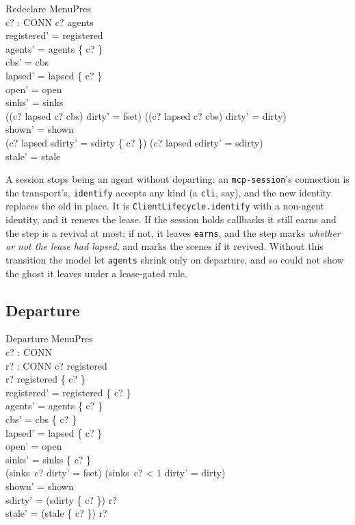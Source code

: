 \documentclass[a4paper,10pt,fleqn]{article}
\begin{document}
\begin{schema}{Redeclare}
  \Delta MenuPres \\
  c? : CONN
\where
  c? \in agents \\
  registered' = registered \\
  agents' = agents \setminus \{ c? \} \\
  cbs' = cbs \\
  lapsed' = lapsed \setminus \{ c? \} \\
  open' = open \\
  sinks' = sinks \\
  ((c? \in lapsed \lor c? \notin cbs) \land dirty' = fset) \lor
    (\lnot (c? \in lapsed \lor c? \notin cbs) \land dirty' = dirty) \\
  shown' = shown \\
  (c? \in lapsed \land sdirty' = sdirty \cup \{ c? \}) \lor
    (c? \notin lapsed \land sdirty' = sdirty) \\
  stale' = stale
\end{schema}

A session stops being an agent without departing: an \texttt{mcp-session}'s
connection is the transport's, \texttt{identify} accepts any kind (a
\texttt{cli}, say), and the new identity replaces the old in place. It is
\texttt{ClientLifecycle.identify} with a non-agent identity, and it renews the
lease. If the session holds callbacks it still earns and the step is a revival
at most; if not, it leaves \texttt{earns}, and the step marks \emph{whether or
not the lease had lapsed}, and marks the scenes if it revived. Without this
transition the model let \texttt{agents} shrink only on departure, and so could
not show the ghost it leaves under a lease-gated rule.

\subsection{Departure}

\begin{schema}{Departure}
  \Delta MenuPres \\
  c? : CONN \\
  r? : \power CONN
\where
  c? \in registered \\
  r? \subseteq registered \setminus \{ c? \} \\
  registered' = registered \setminus \{ c? \} \\
  agents' = agents \setminus \{ c? \} \\
  cbs' = cbs \setminus \{ c? \} \\
  lapsed' = lapsed \setminus \{ c? \} \\
  open' = open \\
  sinks' = sinks \oplus \{ c?  \} \\
  (sinks~c?  \land dirty' = fset) \lor
    (sinks~c? < 1 \land dirty' = dirty) \\
  shown' = shown \\
  sdirty' = (sdirty \setminus \{ c? \}) \cup r? \\
  stale' = (stale \setminus \{ c? \}) \cup r?
\end{schema}
\end{document}
